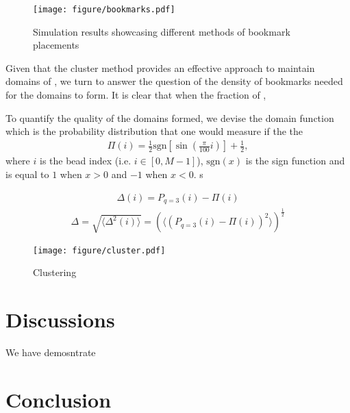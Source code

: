\documentclass[12pt]{article}
\newcommand*{\DataFig}{/Users/MichaelChiang/Desktop/epigenetics_data/}
\begin{document}
\begin{figure}[H]
\centering
\texttt{[image: figure/bookmarks.pdf]}
\caption{Simulation results showcasing different methods of bookmark placements}
\label{fig:cluster}
\end{figure}

Given that the cluster method provides an effective approach to maintain domains of , we turn to answer the question of the density of bookmarks needed for the domains to form. It is clear that when the fraction of , 

To quantify the quality of the domains formed, we devise the domain function which is the probability distribution that one would measure if the the 
\begin{eqnarray}
\Pi(i) = \frac{1}{2}\textrm{sgn}\left[\sin\left(\frac{\pi}{100}i\right)\right] + \frac{1}{2},
\end{eqnarray}
where $i$ is the bead index (i.e. $i \in [0, M-1]$), $\textrm{sgn}(x)$ is the sign function and is equal to $1$ when $x > 0$ and $-1$ when $x < 0$. s

\begin{eqnarray}
\Delta(i) = P_{q=3}(i) - \Pi(i)
\end{eqnarray}
\begin{eqnarray}
\Delta = \sqrt{\langle\Delta^2(i)\rangle} = \left(\langle\left(P_{q=3}(i) - \Pi(i)\right)^2\rangle\right)^{\frac{1}{2}}
\end{eqnarray}

\begin{figure}[h]
\centering
\centerline{\texttt{[image: figure/cluster.pdf]}}
\caption{Clustering}
\label{fig:cluster}
\end{figure}
\FloatBarrier

\section{Discussions}
We have demosntrate

\section{Conclusion}

\pagebreak





\appendix

\end{document}
